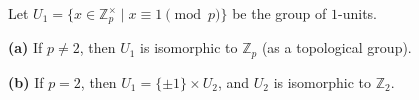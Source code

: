 Let $U_1 = \{x \in \mathbb{Z}_p^\times \mid x \equiv 1 \pmod{p}\}$ be the group of $1$-units.

\textbf{(a)} If $p \neq 2$, then $U_1$ is isomorphic to $\mathbb{Z}_p$ (as a topological group).

\textbf{(b)} If $p = 2$, then $U_1 = \{\pm 1\} \times U_2$, and $U_2$ is isomorphic to $\mathbb{Z}_2$.
